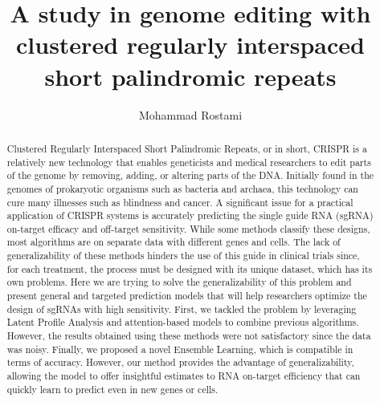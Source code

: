 \documentclass[12pt,a4paper,BCOR=.7cm,headsepline,bibliography=totoc]{report}
\begin{document}
\begin{latin}
\begin{abstract}
Clustered Regularly Interspaced Short Palindromic Repeats, or in short, CRISPR is a relatively new
technology that enables geneticists and medical researchers to edit parts of the genome by removing,
adding, or altering parts of the DNA. Initially found in the genomes of prokaryotic organisms such as
bacteria and archaea, this technology can cure many illnesses such as blindness and cancer. A significant
issue for a practical application of CRISPR systems is accurately predicting the single guide RNA
(sgRNA) on-target efficacy and off-target sensitivity. While some methods classify these designs, most
algorithms are on separate data with different genes and cells. The lack of generalizability of these methods
hinders the use of this guide in clinical trials since, for each treatment, the process must be designed
with its unique dataset, which has its own problems. Here we are trying to solve the generalizability
of this problem and present general and targeted prediction models that will help researchers optimize
the design of sgRNAs with high sensitivity. First, we tackled the problem by leveraging Latent Profile
Analysis and attention-based models to combine previous algorithms. However, the results obtained
using these methods were not satisfactory since the data was noisy. Finally,
we proposed a novel Ensemble Learning, which is compatible in terms of accuracy. However, our
method provides the advantage of generalizability, allowing the model to offer insightful estimates to
RNA on-target efficiency that can quickly learn to predict even in new genes or cells.
\end{abstract}
\end{latin}

\subject{‌Applied Mathematics}
\author{Mohammad Rostami}
\title{A study in genome editing with clustered regularly interspaced short palindromic repeats}
\date{\latintoday}
\makethesisenglishtitle
\end{document}
